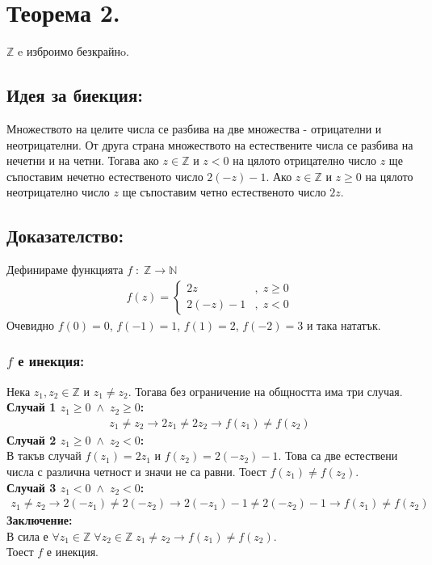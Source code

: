 \documentclass[a4paper, 12pt, oneside]{article}
\newcommand{\N}{\mathbb{N}}
\newcommand{\Z}{\mathbb{Z}}
\begin{document}
\section*{Теорема 2.}
\(\Z\) e изброимо безкрайнo.
\subsection*{Идея за биекция:}
Множеството на целите числа се разбива на две множества - отрицателни и неотрицателни.
От друга страна множеството на естествените числа се разбива на нечетни и на четни.
Тогава ако \(z \in \Z\) и \(z < 0\) на цялото отрицателно число \(z\)
ще съпоставим нечетно естественото число \(2(-z) - 1\).
Ако \(z \in \Z\) и \(z \geq 0\) на цялото неотрицателно число \(z\)
ще съпоставим четно естественото число \(2z\).
\subsection*{Доказателство:}
Дефинираме функцията \(f \; : \; \Z \to \N\)
\begin{align*}
    f(z) = \begin{cases}
        2z & , \; z \geq 0 \\
        2(-z) - 1 & , \; z < 0
    \end{cases}
\end{align*}
Очевидно \(f(0) = 0\), \(f(-1) = 1\), \(f(1) = 2\), \(f(-2) = 3\) и така нататък.
\subsubsection*{\(f\) е инекция:}
Нека \(z_1, z_2 \in \Z\) и \(z_1 \neq z_2\).
Тогава без ограничение на общността има три случая. \\
\textbf{Случай 1 \(z_1 \geq 0 \; \land \; z_2 \geq 0\):}
\begin{align*}
    z_1 \neq z_2 \longrightarrow 2z_1 \neq 2z_2 \longrightarrow f(z_1) \neq f(z_2)
\end{align*}
\textbf{Случай 2 \(z_1 \geq 0 \; \land \; z_2 < 0\):} \\
В такъв случай \(f(z_1) = 2z_1\) и \(f(z_2) =  2(-z_2) - 1\).
Това са две естествени числа с различна четност и значи не са равни.
Тоест \(f(z_1) \neq f(z_2)\). \\
\textbf{Случай 3 \(z_1 < 0 \; \land \; z_2 < 0\):}
\begin{align*}
    z_1 \neq z_2 \longrightarrow 2(-z_1) \neq 2(-z_2) \longrightarrow 2(-z_1) - 1 \neq 2(-z_2) - 1 \longrightarrow f(z_1) \neq f(z_2)
\end{align*}
\textbf{Заключение:} \\
В сила е \(\forall z_1 \in \Z \; \forall z_2 \in \Z \; z_1 \neq z_2 \longrightarrow f(z_1) \neq f(z_2)\). \\
Тоест \(f\) е инекция.
\end{document}
